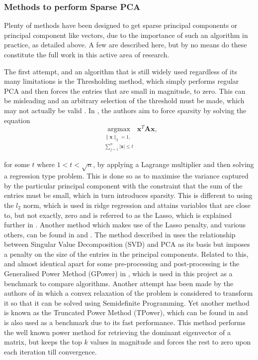 \documentclass[11pt,a4paper]{article}
\begin{document}
\subsubsection{Methods to perform Sparse PCA}
Plenty of methods have been designed to get sparse principal components or principal component like vectors, due to the importance of such an algorithm in practice, as detailed above. A few are described here, but by no means do these constitute the full work in this active area of research.

The first attempt, and an algorithm that is still widely used regardless of its many limitations is the Thresholding method, which simply performs regular PCA and then forces the entries that are small in magnitude, to zero. This can be misleading and an arbitrary selection of the threshold must be made, which may not actually be valid \cite{cadima}. In \cite{scotlass}, the authors aim to force sparsity by solving the equation
\begin{equation*}
\underset{\substack{\|\mathbf{x}\|_2 = 1, \\ \sum_{j=1}^n|\mathbf{x}| \leq t}}
{\operatorname{argmax}}\mathbf{x}^T\mathbf{A}\mathbf{x},
\end{equation*}
 
for some $t$ where $1<t<\sqrt{n}$, by applying a Lagrange multiplier and then solving a regression type problem. This is done so as to maximise the variance captured by the particular principal component with the constraint that the sum of the entries must be small, which in turn introduces sparsity. This is different to using the $l_2$ norm, which is used in ridge regression and attains variables that are close to, but not exactly, zero and is referred to as the Lasso, which is explained further in \cite{lasso}. Another method which makes use of the Lasso penalty, and various others, can be found in \cite{zou} and \cite{shen}. The method described in \cite{shen} uses the relationship between Singular Value Decomposition (SVD) and PCA as its basis but imposes a penalty on the size of the entries in the principal components. Related to this, and almost identical apart for some pre-processing and post-processing is the Generalised Power Method (GPower) in \cite{GPower}, which is used in this project as a benchmark to compare algorithms. Another attempt has been made by the authors of \cite{daspremont} in which a convex relaxation of the problem is considered to transform it so that it can be solved using Semidefinite Programming. Yet another method is known as the Truncated Power Method (TPower), which can be found in \cite{truncpower} and is also used as a benchmark due to its fast performance. This method performs the well known power method for retrieving the dominant eigenvector of a matrix, but keeps the top $k$ values in magnitude and forces the rest to zero upon each iteration till convergence. 
\end{document}
